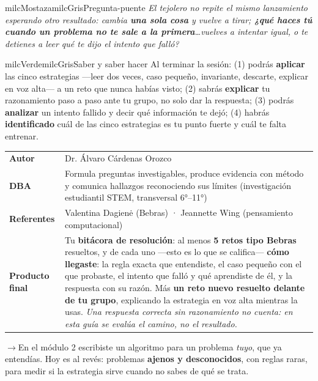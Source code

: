 \documentclass[11pt,letterpaper]{article}
\newcommand{\puente}[1]{%
  \begin{puentebox}%
    \textcolor{milcGradeDark}{$\rightarrow$}\hspace{2mm}#1%
  \end{puentebox}%
}
\begin{document}
\begin{softbox}{milcMostaza}{milcGris}{Pregunta-puente}
\textit{El tejolero no repite el mismo lanzamiento esperando otro resultado: cambia \textbf{una sola cosa} y vuelve a tirar; \textbf{¿qué haces tú cuando un problema no te sale a la primera}\ldots vuelves a intentar igual, o te detienes a leer qué te dijo el intento que falló?}
\end{softbox}

\begin{softbox}{milcVerde}{milcGris}{Saber y saber hacer}
Al terminar la sesión: (1) podrás \textbf{aplicar} las cinco estrategias ---leer dos veces, caso pequeño, invariante, descarte, explicar en voz alta--- a un reto que nunca habías visto; (2) sabrás \textbf{explicar} tu razonamiento paso a paso ante tu grupo, no solo dar la respuesta; (3) podrás \textbf{analizar} un intento fallido y decir qué información te dejó; (4) habrás \textbf{identificado} cuál de las cinco estrategias es tu punto fuerte y cuál te falta entrenar.
\end{softbox}



\small
\begin{tabularx}{\textwidth}{>{\bfseries}p{3.0cm}Y}
Autor & Dr. Álvaro Cárdenas Orozco\\
DBA & Formula preguntas investigables, produce evidencia con método y comunica hallazgos reconociendo sus límites (investigación estudiantil STEM, transversal 6°--11°)\\
Referentes & Valentina Dagienė (Bebras) · Jeannette Wing (pensamiento computacional)\\
Producto final & Tu \textbf{bitácora de resolución}: al menos \textbf{5 retos tipo Bebras} resueltos, y de cada uno ---esto es lo que se califica--- \textbf{cómo llegaste}: la regla exacta que entendiste, el caso pequeño con el que probaste, el intento que falló y qué aprendiste de él, y la respuesta con su razón. Más \textbf{un reto nuevo resuelto delante de tu grupo}, explicando la estrategia en voz alta mientras la usas. \emph{Una respuesta correcta sin razonamiento no cuenta: en esta guía se evalúa el camino, no el resultado.}\\
\end{tabularx}
\normalsize

\puente{En el módulo 2 escribiste un algoritmo para un problema \emph{tuyo}, que ya entendías. Hoy es al revés: problemas \textbf{ajenos y desconocidos}, con reglas raras, para medir si la estrategia sirve cuando no sabes de qué se trata.}
\end{document}
